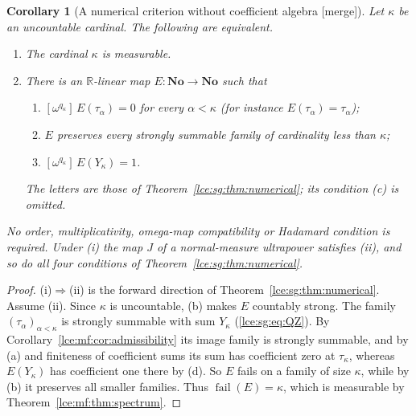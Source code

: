 \documentclass[11pt,letterpaper]{article}
\numberwithin{equation}{section}
\newtheorem{corollary}[theorem]{Corollary}
\theoremstyle{definition}
\theoremstyle{remark}
\newcommand{\No}{\mathbf{No}}
\newcommand{\R}{\mathbb R}
\newcommand{\coef}[2]{[\omega^{#1}]\,#2}
\newcommand{\thref}[1]{Theorem~\ref{#1}}
\newcommand{\mergetag}{\textup{\textsf{\small[merge]}}}%
\newcommand{\fail}{\operatorname{fail}}
\begin{document}
\begin{corollary}[A numerical criterion without coefficient algebra \mergetag]
\label{lce:mf:cor:numerical}
Let $\kappa$ be an uncountable cardinal. The following are equivalent.
\begin{enumerate}[label=\textup{(\roman*)}]
\item The cardinal $\kappa$ is measurable.
\item There is an $\R$-linear map $E:\No\to\No$ such that
\begin{enumerate}
\item[\textup{(a)}] $\coef{q_\kappa}{E(\tau_\alpha)}=0$ for every
$\alpha<\kappa$ (for instance $E(\tau_\alpha)=\tau_\alpha$);
\item[\textup{(b)}] $E$ preserves every strongly summable family of
cardinality less than $\kappa$;
\item[\textup{(d)}] $\coef{q_\kappa}{E(Y_\kappa)}=1$.
\end{enumerate}
The letters are those of \thref{lce:sg:thm:numerical}; its condition (c) is
omitted.
\end{enumerate}
No order, multiplicativity, omega-map compatibility or Hadamard condition is
required. Under (i) the map $J$ of a normal-measure ultrapower satisfies
(ii), and so do all four conditions of \thref{lce:sg:thm:numerical}.
\end{corollary}
\begin{proof}
(i)$\Rightarrow$(ii) is the forward direction of
\thref{lce:sg:thm:numerical}. Assume (ii). Since $\kappa$ is uncountable, (b)
makes $E$ countably strong. The family $(\tau_\alpha)_{\alpha<\kappa}$ is
strongly summable with sum $Y_\kappa$ (\eqref{lce:sg:eq:QZ}). By
Corollary~\ref{lce:mf:cor:admissibility} its image family is strongly
summable, and by (a) and finiteness of coefficient sums its sum has
coefficient zero at $\tau_\kappa$, whereas $E(Y_\kappa)$ has coefficient one
there by (d). So $E$ fails on a family of size $\kappa$, while by (b) it
preserves all smaller families. Thus $\fail(E)=\kappa$, which is measurable
by \thref{lce:mf:thm:spectrum}.
\end{proof}
\end{document}
